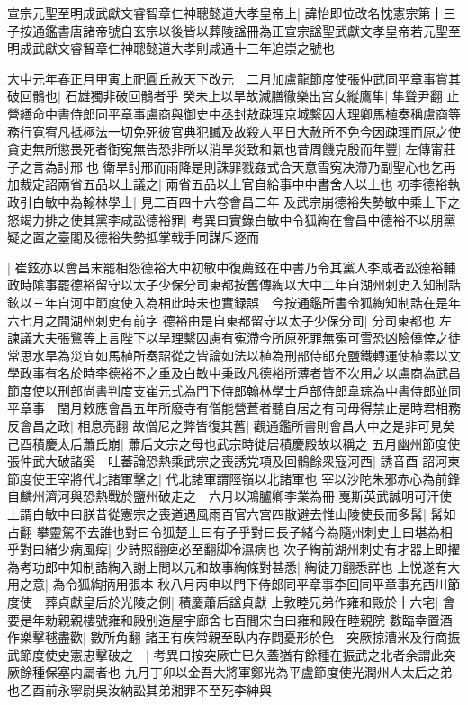 宣宗元聖至明成武獻文睿智章仁神聰懿道大孝皇帝上|{
	諱怡即位改名忱憲宗第十三子按通鑑書唐諸帝號自玄宗以後皆以葬陵諡冊為正宣宗諡聖武獻文孝皇帝若元聖至明成武獻文睿智章仁神聰懿道大孝則咸通十三年追崇之號也}


大中元年春正月甲寅上祀圓丘赦天下改元　二月加盧龍節度使張仲武同平章事賞其破回鶻也|{
	石雄獨非破回鶻者乎}
癸未上以旱故減膳徹樂出宫女縱鷹隼|{
	隼聳尹翻}
止營繕命中書侍郎同平章事盧商與御史中丞封敖疎理京城繫囚大理卿馬植奏稱盧商等務行寛宥凡抵極法一切免死彼官典犯贓及故殺人平日大赦所不免今因疎理而原之使貪吏無所懲畏死者衘寃無告恐非所以消旱災致和氣也昔周饑克殷而年豐|{
	左傳甯莊子之言為討邢也}
衛旱討邢而雨降是則誅罪戮姦式合天意雪寃决滯乃副聖心也乞再加裁定詔兩省五品以上議之|{
	兩省五品以上官自給事中中書舍人以上也}
初李德裕執政引白敏中為翰林學士|{
	見二百四十六卷會昌二年}
及武宗崩德裕失勢敏中乘上下之怒竭力排之使其黨李咸訟德裕罪|{
	考異曰實錄白敏中令狐綯在會昌中德裕不以朋黨疑之置之臺閣及德裕失勢抵掌戟手同謀斥逐而}


|{
	崔鉉亦以會昌末罷相怨德裕大中初敏中復薦鉉在中書乃令其黨人李咸者訟德裕輔政時隂事罷德裕留守以太子少保分司東都按舊傳綯以大中二年自湖州刺史入知制誥鉉以三年自河中節度使入為相此時未也實録誤　今按通鑑所書令狐綯知制誥在是年六七月之間湖州刺史有前字}
德裕由是自東都留守以太子少保分司|{
	分司東都也}
左諫議大夫張鷺等上言陛下以旱理繫囚慮有寃滯今所原死罪無寃可雪恐凶險僥倖之徒常思水旱為災宜如馬植所奏詔從之皆論如法以植為刑部侍郎充鹽鐵轉運使植素以文學政事有名於時李德裕不之重及白敏中秉政凡德裕所薄者皆不次用之以盧商為武昌節度使以刑部尚書判度支崔元式為門下侍郎翰林學士戶部侍郎韋琮為中書侍郎並同平章事　閏月敕應會昌五年所廢寺有僧能營葺者聽自居之有司毋得禁止是時君相務反會昌之政|{
	相息亮翻}
故僧尼之弊皆復其舊|{
	觀通鑑所書則會昌大中之是非可見矣}
己酉積慶太后蕭氏崩|{
	蕭后文宗之母也武宗時徙居積慶殿故以稱之}
五月幽州節度使張仲武大破諸奚　吐蕃論恐熱乘武宗之喪誘党項及回鶻餘衆寇河西|{
	誘音酉}
詔河東節度使王宰將代北諸軍擊之|{
	代北諸軍謂陘嶺以北諸軍也}
宰以沙陀朱邪赤心為前鋒自麟州濟河與恐熱戰於鹽州破走之　六月以鴻臚卿李業為冊戛斯英武誠明可汗使　上謂白敏中曰朕昔從憲宗之喪道遇風雨百官六宫四散避去惟山陵使長而多髯|{
	髯如占翻}
攀靈駕不去誰也對曰令狐楚上曰有子乎對曰長子緒今為隨州刺史上曰堪為相乎對曰緒少病風痺|{
	少詩照翻痺必至翻脚冷濕病也}
次子綯前湖州刺史有才器上即擢為考功郎中知制誥綯入謝上問以元和故事綯條對甚悉|{
	綯徒刀翻悉詳也}
上悦遂有大用之意|{
	為令狐綯抦用張本}
秋八月丙申以門下侍郎同平章事李回同平章事充西川節度使　葬貞獻皇后於光陵之側|{
	積慶蕭后諡貞獻}
上敦睦兄弟作雍和殿於十六宅|{
	會要是年勅親親樓號雍和殿别造屋宇廊舍七百間宋白曰雍和殿在睦親院}
數臨幸置酒作樂擊毬盡歡|{
	數所角翻}
諸王有疾常親至臥内存問憂形於色　突厥掠漕米及行商振武節度使史憲忠擊破之　|{
	考異曰按突厥亡巳久蓋猶有餘種在振武之北者余謂此突厥餘種保塞内屬者也}
九月丁卯以金吾大將軍鄭光為平盧節度使光潤州人太后之弟也乙酉前永寧尉吳汝納訟其弟湘罪不至死李紳與

